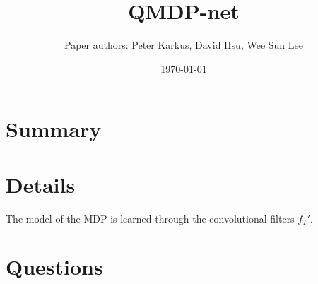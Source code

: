 \documentclass{article}[11pt]
\title{QMDP-net}
\author{Paper authors: Peter Karkus, David Hsu, Wee Sun Lee}
\date{\today}
\begin{document}
\maketitle

\section{Summary}

\section{Details}

The model of the MDP is learned through
the convolutional filters $f_T'$.

\section{Questions}
\end{document}
